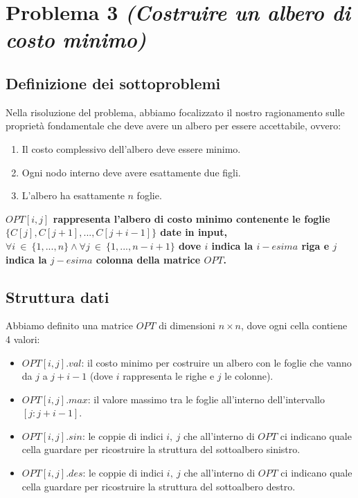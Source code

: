 \section{Problema 3 \textit{(Costruire un albero di costo minimo)}}

\subsection{Definizione dei sottoproblemi}

Nella risoluzione del problema, abbiamo focalizzato il nostro ragionamento sulle proprietà fondamentale che deve avere un albero per
essere accettabile, ovvero:
\begin{enumerate}
	\item Il costo complessivo dell'albero deve essere minimo.
	\item Ogni nodo interno deve avere esattamente due figli.
	\item L'albero ha  esattamente $n$ foglie.
\end{enumerate}

\begin{center}
	\textbf{$OPT[i, j]$ rappresenta l'albero di costo minimo contenente le foglie $\{C[j], C[j + 1], ..., C[j + i - 1]\}$ date in input, 
		$\forall i\ \in\ \{1, ..., n\} \land \forall j\ \in\ \{1, ..., n - i + 1\}$ dove $i$ indica la $i-esima$ riga e $j$ indica la $j-esima$ colonna della matrice $OPT$.}
\end{center}

\subsection{Struttura dati}

Abbiamo definito una matrice $OPT$ di dimensioni $n \times n$, dove ogni cella contiene 4 valori:

\begin{itemize}
	\item $OPT[i, j].val$: il costo minimo per costruire un albero con le foglie che vanno da $j$ a $j + i - 1$ (dove $i$ rappresenta le righe e $j$ le colonne).
	\item $OPT[i, j].max$: il valore massimo tra le foglie all'interno dell'intervallo $[j: j + i - 1]$.
	\item $OPT[i, j].sin$: le coppie di indici $i,\ j$ che all'interno di $OPT$ ci indicano quale cella guardare per ricostruire la struttura del sottoalbero sinistro.
	\item $OPT[i, j].des$: le coppie di indici $i,\ j$ che all'interno di $OPT$ ci indicano quale cella guardare per ricostruire la struttura del sottoalbero destro.
\end{itemize}

